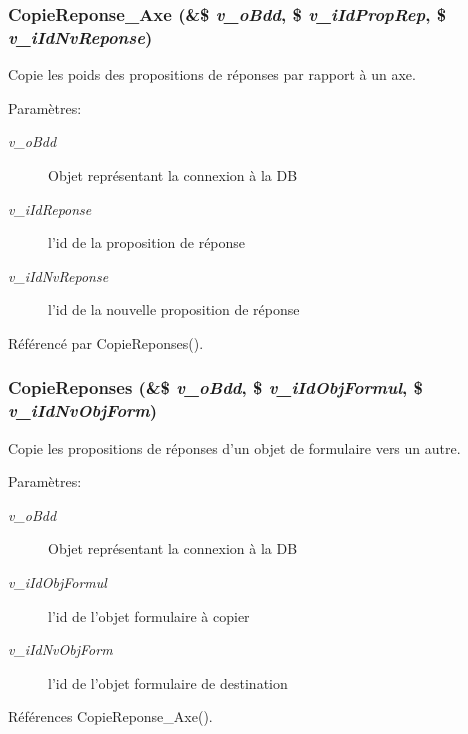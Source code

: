 \subsubsection{\setlength{\rightskip}{0pt plus 5cm}CopieReponse\_\-Axe (\&\$ {\em v\_\-oBdd}, \/  \$ {\em v\_\-iIdPropRep}, \/  \$ {\em v\_\-iIdNvReponse})}\label{fonctions__form_8inc_8php_8e65f59ba6593f05bf0cd75ae77ed9dc}


Copie les poids des propositions de réponses par rapport à un axe. 

\begin{Desc}
\item[Paramètres:]
\begin{description}
\item[{\em v\_\-oBdd}]Objet représentant la connexion à la DB \item[{\em v\_\-iIdReponse}]l'id de la proposition de réponse \item[{\em v\_\-iIdNvReponse}]l'id de la nouvelle proposition de réponse \end{description}
\end{Desc}


Référencé par CopieReponses().
\subsubsection{\setlength{\rightskip}{0pt plus 5cm}CopieReponses (\&\$ {\em v\_\-oBdd}, \/  \$ {\em v\_\-iIdObjFormul}, \/  \$ {\em v\_\-iIdNvObjForm})}\label{fonctions__form_8inc_8php_7d56b26503395feaec8d871d5d80d29b}


Copie les propositions de réponses d'un objet de formulaire vers un autre. 

\begin{Desc}
\item[Paramètres:]
\begin{description}
\item[{\em v\_\-oBdd}]Objet représentant la connexion à la DB \item[{\em v\_\-iIdObjFormul}]l'id de l'objet formulaire à copier \item[{\em v\_\-iIdNvObjForm}]l'id de l'objet formulaire de destination \end{description}
\end{Desc}


Références CopieReponse\_\-Axe().

